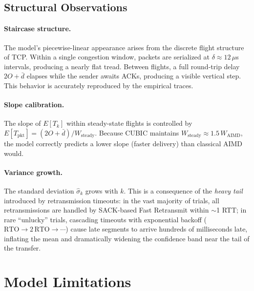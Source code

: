 \documentclass[11pt,letterpaper]{article}
\begin{document}
\subsection{Structural Observations}

\paragraph{Staircase structure.}
The model's piecewise-linear appearance arises from the discrete flight
structure of TCP.  Within a single congestion window, packets are serialized at
$\delta \approx 12\,\mu$s intervals, producing a nearly flat tread.  Between
flights, a full round-trip delay $2O + \bar{d}$ elapses while the sender awaits
ACKs, producing a visible vertical step.  This behavior is accurately reproduced
by the empirical traces.

\paragraph{Slope calibration.}
The slope of $E[T_k]$ within steady-state flights is controlled by
$E[T_{\mathrm{pkt}}] = (2O+\bar{d})/W_{\mathrm{steady}}$.  Because CUBIC
maintains $W_{\mathrm{steady}} \approx 1.5\,W_{\mathrm{AIMD}}$, the model
correctly predicts a lower slope (faster delivery) than classical AIMD would.

\paragraph{Variance growth.}
The standard deviation $\hat{\sigma}_k$ grows with $k$.  This is a consequence
of the \emph{heavy tail} introduced by retransmission timeouts: in the vast
majority of trials, all retransmissions are handled by SACK-based Fast
Retransmit within $\sim$1 RTT; in rare ``unlucky'' trials, cascading timeouts
with exponential backoff ($\mathrm{RTO} \to 2\,\mathrm{RTO} \to \cdots$) cause
late segments to arrive hundreds of milliseconds late, inflating the mean and
dramatically widening the confidence band near the tail of the transfer.

\section{Model Limitations}
\label{sec:limitations}
\end{document}
